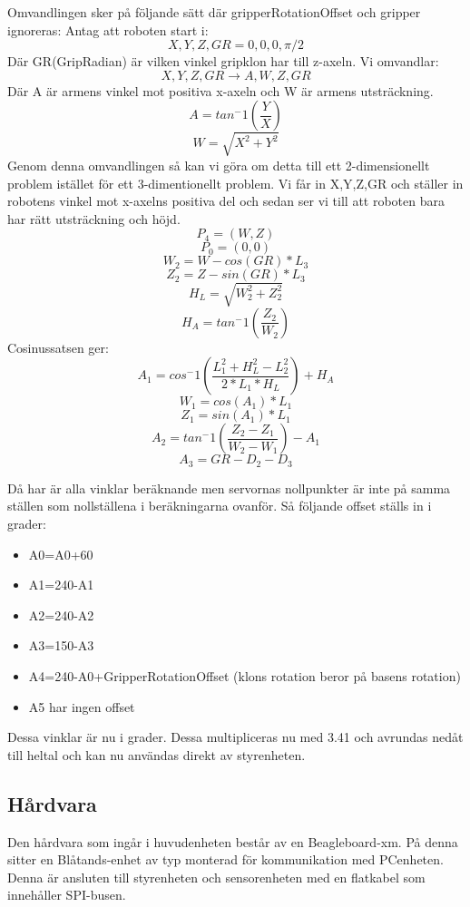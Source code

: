 

Omvandlingen sker på följande sätt där gripperRotationOffset och gripper ignoreras:
Antag att roboten start i: $$X,Y,Z,GR=0,0,0,\pi/2$$
Där GR(GripRadian) är vilken vinkel gripklon har till z-axeln.\newline
Vi omvandlar:$$ X,Y,Z,GR\rightarrow A,W,Z,GR$$
Där A är armens vinkel mot positiva x-axeln och W är armens utsträckning.
$$A=tan^-1(\dfrac{Y}{X}) $$
$$W=\sqrt{X^2+Y^2}$$
Genom denna omvandlingen så kan vi göra om detta till ett 2-dimensionellt problem istället för ett 3-dimentionellt problem. Vi får in X,Y,Z,GR och ställer in robotens vinkel mot x-axelns positiva del och sedan ser vi till att roboten bara har rätt utsträckning och höjd.
$$P_4=(W,Z)$$
$$P_0=(0,0)$$
$$W_2=W-cos(GR)*L_3$$
$$Z_2=Z-sin(GR)*L_3$$
$$H_L=\sqrt{W_2^2+Z_2^2}$$
$$H_A=tan^-1(\dfrac{Z_2}{W_2})$$
Cosinussatsen ger:
$$A_1=cos^-1(\dfrac{L_1^2+H_L^2-L_2^2}{2*L_1*H_L})+H_A$$
$$W_1=cos(A_1)*L_1$$
$$Z_1=sin(A_1)*L_1$$
$$A_2=tan^-1(\dfrac{Z_2-Z_1}{W_2-W_1})-A_1$$
$$A_3=GR-D_2-D_3$$

Då har är alla vinklar beräknande men servornas nollpunkter är inte på samma ställen som nollställena i beräkningarna ovanför. Så följande offset ställs in i grader:
\begin{itemize}
\item A0=A0+60
\item A1=240-A1
\item A2=240-A2
\item A3=150-A3
\item A4=240-A0+GripperRotationOffset (klons rotation beror på basens rotation)
\item A5 har ingen offset
\end{itemize}
Dessa vinklar är nu i grader. Dessa multipliceras nu med 3.41 och avrundas nedåt till heltal och kan nu användas direkt av styrenheten.
\subsection{Hårdvara}
Den hårdvara som ingår i huvudenheten består av en Beagleboard-xm. På denna sitter en Blåtands-enhet av typ  monterad för kommunikation med PCenheten. Denna är ansluten till styrenheten och sensorenheten med en flatkabel som innehåller SPI-busen.

